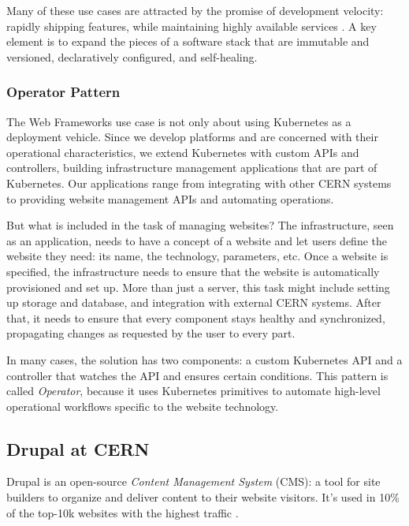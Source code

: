 Many of these use cases are attracted by the promise of development velocity:
rapidly shipping features, while maintaining highly available services \cite{hightowerKubernetesRunningDive2017}.
A key element is to expand the pieces of a software stack that are immutable and versioned, declaratively configured, and self-healing.

\subsubsection*{Operator Pattern \cite{operatorPattern}}
\label{sec-operators}

The Web Frameworks use case is not only about using Kubernetes as a deployment vehicle.
Since we develop platforms and are concerned with their operational characteristics,
we extend Kubernetes with custom APIs and controllers, building infrastructure management applications that are part of Kubernetes.
Our applications range from integrating with other CERN systems to providing website management APIs and automating operations.

But what is included in the task of managing websites?
The infrastructure, seen as an application, needs to have a concept of a website and let users define the website they need: its name, the technology, parameters, etc.
Once a website is specified, the infrastructure needs to ensure that the website is automatically provisioned and set up.
More than just a server, this task might include setting up storage and database, and integration with external CERN systems.
After that, it needs to ensure that every component stays healthy and synchronized, propagating changes as requested by the user to every part.

In many cases, the solution has two components: a custom Kubernetes API and a controller that watches the API and ensures certain conditions.
This pattern is called \emph{Operator}, because it uses Kubernetes primitives to automate high-level operational workflows specific to the website technology.

\subsection{Drupal at CERN}
\label{what-is-drupal}
\label{drupal-at-cern}

Drupal is an open-source \emph{Content Management System} (CMS): a tool for site builders to organize and deliver content to their website visitors.
It's used in 10\% of the top-10k websites with the highest traffic \cite{builtwithptyltdOpenSourceUsage,q-successdigelbmanngmbhWordPressVsDrupal}.

